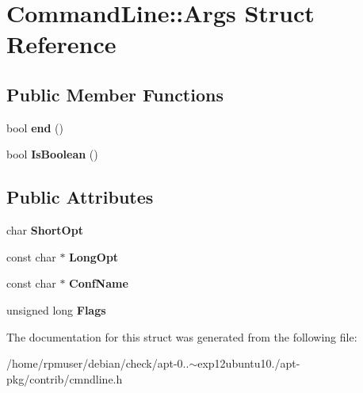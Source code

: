 \section{\-Command\-Line\-:\-:\-Args \-Struct \-Reference}
\label{structCommandLine_1_1Args}
\subsection*{\-Public \-Member \-Functions}
\begin{DoxyCompactItemize}
\item 
bool {\bfseries end} ()\label{structCommandLine_1_1Args_af545ab12986d2fe462f1013c3bafb5f3}

\item 
bool {\bfseries \-Is\-Boolean} ()\label{structCommandLine_1_1Args_a6ffce0aed1fc2f51a4c1e2358d891d8a}

\end{DoxyCompactItemize}
\subsection*{\-Public \-Attributes}
\begin{DoxyCompactItemize}
\item 
char {\bfseries \-Short\-Opt}\label{structCommandLine_1_1Args_a0a7b5c585524d78b40984f26dfabf4ce}

\item 
const char $\ast$ {\bfseries \-Long\-Opt}\label{structCommandLine_1_1Args_abb9a494e0a856c76db8bac3af568960d}

\item 
const char $\ast$ {\bfseries \-Conf\-Name}\label{structCommandLine_1_1Args_af66dc5adf2bddf96b22beefab780c8ca}

\item 
unsigned long {\bfseries \-Flags}\label{structCommandLine_1_1Args_a15eb852dd5568416ca012c6dcbff021b}

\end{DoxyCompactItemize}


\-The documentation for this struct was generated from the following file\-:\begin{DoxyCompactItemize}
\item 
/home/rpmuser/debian/check/apt-\/0..$\sim$exp12ubuntu10./apt-\/pkg/contrib/cmndline.\-h\end{DoxyCompactItemize}
